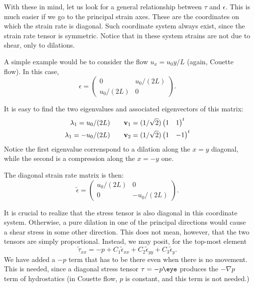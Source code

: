 With these in mind, let us look for a general relationship between
$\tau$ and $\epsilon$. This is much easier if we go to the principal
strain axes. These are the coordinates on which the strain rate is
diagonal. Such coordinate system always exist, since the strain rate
tensor is symmetric. Notice that in these system strains are not due to
shear, only to dilations.

A simple example would be to consider the flow $u_x = u_0 y / L$
(again, Couette flow). In this case,
\[
\epsilon=
\begin{pmatrix}
  0           &   u_0/(2L)  \\
   u_0/(2L)   &   0
\end{pmatrix} .
\]

It is easy to find the two eigenvalues and associated eigenvectors of
this matrix:
\begin{align*}
  \lambda_1=  u_0/(2L) \qquad &\mathbf{v}_1=(1/\sqrt{2}) \begin{pmatrix} 1 &  1 \end{pmatrix}^t \\
  \lambda_1= -u_0/(2L) \qquad &\mathbf{v}_2=(1/\sqrt{2})  \begin{pmatrix} 1 &  -1 \end{pmatrix}^t \\
\end{align*}
Notice the first eigenvalue correnspond to a dilation along the $x=y$
diagonal, while the second is a compression along the $x=-y$ one.

The diagonal strain rate matrix is then:
\[
\tilde{\epsilon}=
\begin{pmatrix}
  u_0/(2L)   & 0 \\
  0          & - u_0/(2L)
\end{pmatrix} .
\]

It is crucial to realize that the stress tensor is also diagonal in
this coordinate system. Otherwise, a pure dilation in one of the
principal directions would cause a shear stress in some other
direction. This does not mean, however, that the two tensors are
simply proportional. Instead, we may posit, for the top-most element
\[
\tilde{\tau}_{xx}=
- p + 
C_1 \tilde{\epsilon}_{xx} +
C_2 \tilde{\epsilon}_{yy} +
C_3 \tilde{\epsilon}_{y} .
\]
We have added a $-p$ term that has to be there even when there is no
movement. This is needed, since a diagonal stress tensor $\tau=-p\eye$
produces the $-\nabla p$ term of hydrostatics (in Couette flow, $p$ is
constant, and this term is not needed.)

